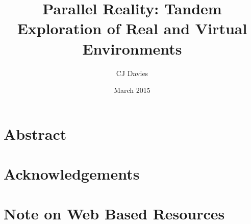 \documentclass[a4paper]{report}
\begin{document}
\title{Parallel Reality: Tandem Exploration of Real and Virtual Environments}
\date{March 2015}
\author{CJ Davies}


\pagebreak

\thispagestyle{empty}





\pagestyle{fancy}
\fancyhead[L]{\nouppercase{\leftmark}}
\fancyhead[R]{\thepage}
\fancyfoot[C]{}

\chapter*{Abstract}



\chapter*{Acknowledgements}



\chapter*{Note on Web Based Resources}



%


\tableofcontents
\end{document}
